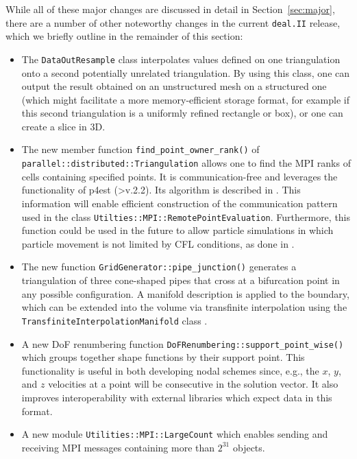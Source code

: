\documentclass{ansarticle-preprint}
\newcommand{\specialword}[1]{\texttt{#1}}
\newcommand{\dealii}{{\specialword{deal.II}}\xspace}
\begin{document}
While all of these major changes are discussed in detail in
Section~\ref{sec:major}, there
are a number of other noteworthy changes in the current \dealii{} release,
which we briefly outline in the remainder of this section:
%
\begin{itemize}
  \item The \texttt{DataOutResample} class interpolates values defined on one
  triangulation onto a second potentially unrelated triangulation.
  By using this class, one can output the result obtained on an
  unstructured mesh on a structured one (which might facilitate a more
  memory-efficient storage format, for example if this second
  triangulation is a uniformly refined rectangle or box), or one can create a slice in 3D.
  \item The new member function \texttt{find\_point\_owner\_rank()} of
        \texttt{parallel\allowbreak ::distributed::\allowbreak Tri\allowbreak angulation} allows one to find the MPI
  ranks of cells containing specified points.
  It is communication-free and leverages the functionality of p4est (>v.2.2).
  Its algorithm is described in \cite{burstedde2020parallel}. This information will
  enable efficient construction of the
  communication pattern used in the class \texttt{Utilties::\allowbreak MPI::\allowbreak RemotePointEvaluation}. Furthermore, this function could be used in the future to allow
  particle simulations in which particle movement is not
  limited by CFL conditions, as done in \cite{mirzadeh2016parallel}.
  \item The new function
  \texttt{GridGenerator::pipe\_junction()}
  generates a triangulation of three cone-shaped pipes that cross at a bifurcation point in any possible configuration.
  A manifold description is applied to the boundary, which can be extended into the volume via transfinite interpolation \cite{Gordon82} using the \texttt{TransfiniteInterpolationManifold} class \cite{dealII90}.
  \item A new DoF renumbering function \texttt{DoFRenumbering::support\_point\_wise()} which groups together
  shape functions by their support point. This functionality is useful in both developing nodal schemes since, e.g., the $x$, $y$, and $z$
  velocities at a point will be consecutive in the solution vector. It also improves interoperability with external libraries which expect
  data in this format.
  \item A new module \texttt{Utilities::MPI::LargeCount} which enables sending and receiving MPI messages containing more than $2^{31}$ objects.

\end{itemize}
\end{document}
